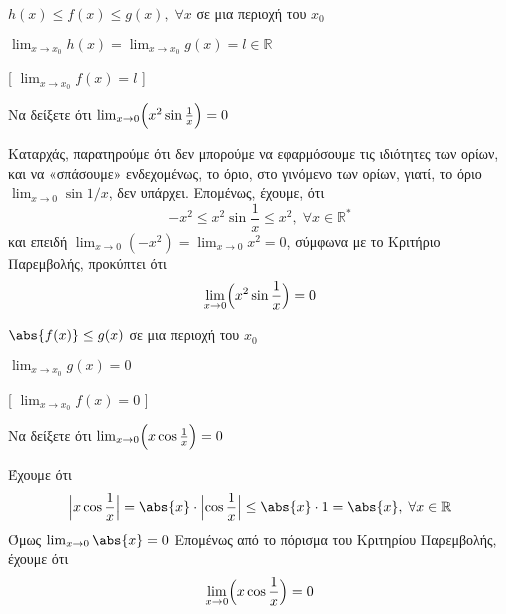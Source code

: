 \begin{prop}
\item {}
  \begin{minipage}[t]{8.0 cm}
    \begin{myitemize}
      \item $ h(x) \leq f(x) \leq g(x), \; \forall x$ σε μια περιοχή του $ x_{0} $
        \hfill{}
      \item $ \lim_{x \to x_{0}} h(x) = \lim_{x \to x_{0}} g(x) = l \in \mathbb{R} $
        \hfill{}
    \end{myitemize}
  \end{minipage}
  [ $ \lim_{x \to x_{0}} f(x) = l $ ]
\end{prop}

\begin{example}
  Να δείξετε ότι $ \lim_{x \to 0} \Bigl(x^{2} \sin{\frac{1}{x}}\Bigr) = 0  $ 
\end{example}
\begin{solution}
  Καταρχάς, παρατηρούμε ότι δεν μπορούμε να εφαρμόσουμε τις ιδιότητες των ορίων, και να 
  «σπάσουμε» ενδεχομένως, το όριο, στο γινόμενο των ορίων, γιατί, το όριο 
  $ \lim_{x \to 0} \sin{1/x} $, δεν υπάρχει.
  Επομένως, έχουμε, ότι
  \[
    - x^{2} \leq x^{2} \sin{\frac{1}{x}} \leq x^{2}, \; \forall x \in \mathbb{R}^{*}
  \]
  και επειδή $ \lim_{x \to 0} (-x^{2}) = \lim_{x \to 0} x^{2} = 0 $, σύμφωνα με το 
  Κριτήριο Παρεμβολής, προκύπτει ότι 
  \[
    \lim_{x \to 0} \Bigl(x^{2} \sin{\frac{1}{x}}\Bigr)  = 0
  \]
\end{solution}

\begin{cor}
\item {}
  \begin{minipage}[t]{6.5 cm}
    \begin{myitemize}
      \item $ \abs{f(x)} \leq g(x) $ σε μια περιοχή του $ x_{0} $
        \hfill{}
      \item $ \lim_{x \to x_{0}} g(x) = 0 $
        \hfill{}
    \end{myitemize}
  \end{minipage}
  [ $ \lim_{x \to x_{0}} f(x) = 0 $ ]
\end{cor}

\begin{example}
  Να δείξετε ότι $ \lim_{x \to 0} \Bigl(x \cos{\frac{1}{x}}\Bigr) = 0 $
\end{example}
\begin{solution}
  Έχουμε ότι
  \[
    \Bigl|x \cos{\frac{1}{x}}\Bigr| = \abs{x} \cdot 
    \Bigl|\cos{\frac{1}{x}}\Bigr| \leq \abs{x} \cdot 1 = 
    \abs{x}, \; \forall x \in \mathbb{R}
  \] 
  Όμως $ \lim_{x \to 0} \abs{x} = 0 $
  Επομένως από το πόρισμα του Κριτηρίου Παρεμβολής, έχουμε ότι 
  \[
    \lim_{x \to 0} \Bigl(x \cos{\frac{1}{x}}\Bigr) = 0 
  \] 
\end{solution}


